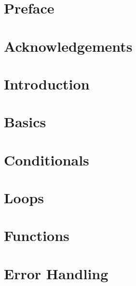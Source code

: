 \documentclass[12pt]{scrbook}
\begin{document}
\chapter{Preface}


\chapter{Acknowledgements}


\tableofcontents

\listofalgorithms


\listoflistings

\listoffigures

\mainmatter

\chapter{Introduction}


\chapter{Basics}



\chapter{Conditionals}
\label{chapter:conditionals}



\chapter{Loops}
\label{chapter:loops}



\chapter{Functions}



\chapter{Error Handling}
\label{chapter:errorHandling}


\end{document}
